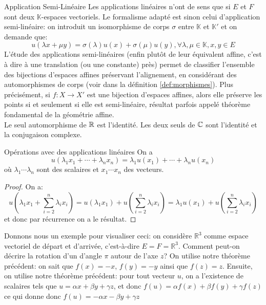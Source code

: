 \documentclass{classe}
\renewcommand*{\K}{\mathbb{K}}
\begin{document}
\begin{remarque}{Application Semi-Linéaire}{}
Les applications linéaires n'ont de sens que si $E$ et $F$ sont deux $\K$-espaces vectoriels.
Le formalisme adapté est sinon celui d'application semi-linéaire: on introduit un isomorphisme de corps $\sigma$ entre $\K$ et $\K'$ et on demande que:
\begin{equation*}
	u\left( \lambda x + \mu y \right) = \sigma\left( \lambda \right)u(x) + \sigma\left( \mu \right)u(y), \forall \lambda, \mu \in \K, x, y \in E
\end{equation*}
L'étude des applications semi-linéaires (enfin plutôt de leur équivalent affine, c'est à dire à une translation (ou une constante) près) permet de classifier l'ensemble des bijections d'espaces affines préservant l'alignement, en considérant des automorphismes de corps (voir dans la définition \ref{def:morphismes}).
Plus précisément, si $f: X \to X'$ est une bijection d'espaces affines, alors elle préserve les points si et seulement si elle est semi-linéaire, résultat parfois appelé théorème fondamental de la géométrie affine.\\
Le seul automorphisme de $\mathbb{R}$ est l'identité. Les deux seuls de $\mathbb{C}$ sont l'identité et la conjugaison complexe.
\end{remarque}

\begin{propositionfr}{Opérations avec des applications linéaires}{}
	On a
	\begin{equation*}
		u(\lambda_1 x_1 + \cdots + \lambda_n x_n) = \lambda_1 u(x_1) + \cdots + \lambda_n u(x_n)
	\end{equation*}
	où $\lambda_1 \cdots \lambda_n$ sont des scalaires et $x_1 \cdots x_n$ des vecteurs.
\end{propositionfr}
\begin{proof}
	On a:
	\begin{equation*}
		u\left( \lambda_{1}x_{1} + \sum_{i = 2}^{n} \lambda_{i}x_{i}\right) = u\left( \lambda_{1}x_{1} \right) + u\left( \sum_{i = 2}^{n} \lambda_{i}x_{i} \right) = \lambda_{1}u\left( x_{1} \right) + u\left( \sum_{i = 2}^{n} \lambda_{i}x_{i} \right)
	\end{equation*}
	et donc par récurrence on a le résultat.
\end{proof}

\begin{example}
Donnons nous un exemple pour visualiser ceci: on considère $\mathbb{R}^3$ comme espace vectoriel de départ et d'arrivée, c'est-à-dire $E = F = \mathbb{R}^3$.
Comment peut-on décrire la rotation d'un d'angle $\pi$ autour de l'axe $z$?
On utilise notre théorème précédent: on sait que $f(x) = -x$, $f(y) = -y$ ainsi que $f(z) = z$.
Ensuite, on utilise notre théorème précédent: pour tout vecteur $u$, on a l'existence de scalaires tels que $u = \alpha x + \beta y + \gamma z$, et donc $f(u) = \alpha f(x) + \beta f(y) + \gamma f(z)$ ce qui donne donc $f(u) = -\alpha x - \beta y + \gamma z$
\end{example}
\end{document}
